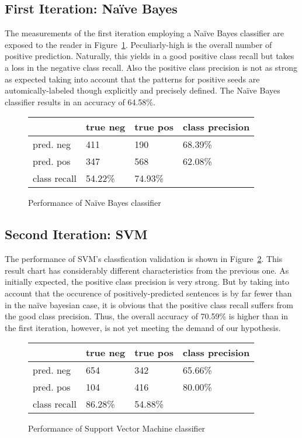 \documentclass[11pt,titlepage,oneside,openany]{book}
\begin{document}
\subsection{First Iteration: Na\"{i}ve Bayes}
\label{sec:nb}

The measurements of the first iteration employing a Na\"{i}ve Bayes classifier are exposed to the reader in Figure~\ref{fig.nb}. Peculiarly-high is the overall number of positive prediction. Naturally, this yields in a good positive class recall but takes a loss in the negative class recall. Also the positive class precision is not as strong as expected taking into account that the patterns for positive seeds are automically-labeled though explicitly and precisely defined. The Na\"{i}ve Bayes classifier results in an accuracy of 64.58\%.

\begin{figure} [h!]
\centering
\begin{tabular}{ | l | l | l | l | }
\hline
	 & true neg & true pos & class precision \\ \hline
	pred. neg & 411 & 190 & 68.39\% \\ \hline
	pred. pos & 347 & 568 & 62.08\% \\ \hline
	class recall & 54.22\% & 74.93\% &  \\ \hline
\end{tabular}
\caption{Performance of Na\"{i}ve Bayes classifier}
\label{fig.nb}
\end{figure}


\subsection{Second Iteration: SVM}
\label{sec:svm}

The performance of SVM's classfication validation is shown in Figure~\ref{fig.svm}. This result chart has considerably different characteristics from the previous one. As initially expected, the positive class precision is very strong. But by taking into account that the occurence of positively-predicted sentences is by far fewer than in the na\"{i}ve bayesian case, it is obvious that the positive class recall suffers from the good class precision. Thus, the overall accuracy of 70.59\% is higher than in the first iteration, however, is not yet meeting the demand of our hypothesis.

\begin{figure} [h!]
\centering
\begin{tabular}{ | l | l | l | l | }
\hline
	 & true neg & true pos & class precision \\ \hline
	pred. neg & 654 & 342 & 65.66\% \\ \hline
	pred. pos & 104 & 416 & 80.00\% \\ \hline
	class recall & 86.28\% & 54.88\% &  \\ \hline
\end{tabular}
\caption{Performance of Support Vector Machine classifier}
\label{fig.svm}
\end{figure}
\end{document}
